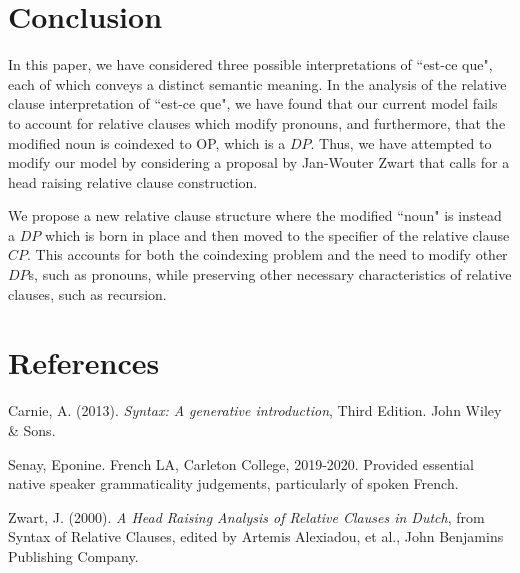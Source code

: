 \documentclass{article}
\begin{document}
\section{Conclusion}

In this paper, we have considered three possible interpretations of ``est-ce que", each of which conveys a distinct semantic meaning. In the analysis of the relative clause interpretation of ``est-ce que", we have found that our current model fails to account for relative clauses which modify pronouns, and furthermore, that the modified noun is coindexed to OP, which is a $DP$. Thus, we have attempted to modify our model by considering a proposal by Jan-Wouter Zwart that calls for a head raising relative clause construction.

We propose a new relative clause structure where the modified ``noun" is instead a $DP$ which is born in place and then moved to the specifier of the relative clause $CP$. This accounts for both the coindexing problem and the need to modify other $DP$s, such as pronouns, while preserving other necessary characteristics of relative clauses, such as recursion.

\section{References}

Carnie, A. (2013). \textit{Syntax: A generative introduction}, Third Edition. John Wiley \& Sons.

Senay, Eponine. French LA, Carleton College, 2019-2020. Provided essential native speaker grammaticality judgements, particularly of spoken French.

Zwart, J. (2000).  \textit{A Head Raising Analysis of Relative Clauses in Dutch}, from Syntax of Relative Clauses, edited by Artemis Alexiadou, et al., John Benjamins Publishing Company.
\end{document}
